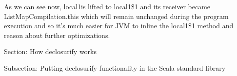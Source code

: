 %      

As we can see now, local1is lifted to local1\$1 and its receiver became
ListMapCompilation.this which will remain unchanged during the program
execution and so it's much easier for JVM to inline the local1\$1 method and
reason about further optimizations.


Section: How declosurify works


Subsection: Putting declosurify functionality in the Scala standard library

